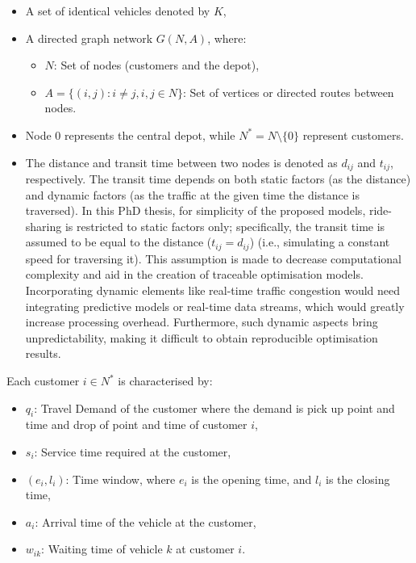 \begin{itemize}
    \item A set of identical vehicles denoted by \( K \),
    \item A directed graph network \( G(N, A) \), where:
    \begin{itemize}
        \item \( N \): Set of nodes (customers and the depot),
        \item \( A = \{(i, j) : i \neq j, i, j \in N\} \): Set of vertices or directed routes between nodes.
    \end{itemize}
    \item Node \( 0 \) represents the central depot, while \( N^* = N \setminus \{0\} \) represent customers.
    \item The distance and transit time between two nodes is denoted as \( d_{ij} \) and \( t_{ij} \), respectively. The transit time depends on both static factors (as the distance) and dynamic factors (as the traffic at the given time the distance is traversed). In this PhD thesis, for simplicity of the proposed models, ride-sharing is restricted to static factors only; specifically, the transit time is assumed to be equal to the distance (\( t_{ij} = d_{ij} \)) (i.e., simulating a constant speed for traversing it). This assumption is made to decrease computational complexity and aid in the creation of traceable optimisation models. Incorporating dynamic elements like real-time traffic congestion would need integrating predictive models or real-time data streams, which would greatly increase processing overhead. Furthermore, such dynamic aspects bring unpredictability, making it difficult to obtain reproducible optimisation results. 
\end{itemize}

Each customer \( i \in N^* \) is characterised by:
\begin{itemize}
    \item \( q_i \): Travel Demand of the customer where the demand is pick up point and time and drop of point and time of customer \(i\),
    \item \( s_i \): Service time required at the customer,
    \item \( (e_i, l_i) \): Time window, where \( e_i \) is the opening time, and \( l_i \) is the closing time,
    \item \( a_i \): Arrival time of the vehicle at the customer,
    \item \( w_{ik} \): Waiting time of vehicle \( k \) at customer \( i \).
\end{itemize}

